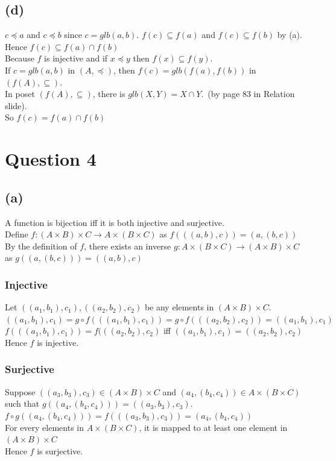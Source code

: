 \documentclass{article} %
\begin{document}
\subsection*{(d)}
$c \preceq a$ and $c \preceq b$ since $c=glb(a,b)$. $ f(c)\subseteq f(a)$ and $ f(c) \subseteq f(b) $ by (a). Hence $f(c) \subseteq f(a) \cap f(b)$\\
Because $f$ is injective and if $x\preceq y$ then $f(x) \subseteq f(y)$.\\
If $c=glb(a,b)$ in $(A, \preceq)$, then $f(c) = glb(f(a),f(b))$ in $(f(A),\subseteq)$.\\
In poset $(f(A), \subseteq)$, there is $glb(X,Y) = X \cap Y$.\ (by page 83 in Relation slide).\\
So $f(c) = f(a) \cap f(b)$


\section*{Question 4}
\subsection*{(a)}
A function is bijection iff it is both injective and surjective.\\
Define $f:(A \times B) \times C \to A \times (B \times C)$ as $f(((a, b),c)) = (a,(b,c))$\\
By the definition of $f$, there exists an inverse $g:A \times (B \times C) \to (A \times B) \times C$ as $g((a,(b,c))) = ((a, b),c)$
\subsubsection*{Injective}
Let $((a_1, b_1), c_1),((a_2, b_2), c_2)$ be any elements in $(A \times B) \times C$.\\
$((a_1, b_1), c_1) = g \circ f(((a_1, b_1), c_1)) = g \circ f(((a_2, b_2), c_2)) = ((a_1, b_1), c_1)$\\
$f(((a_1, b_1), c_1)) = f(((a_2, b_2), c_2)$ iff $((a_1, b_1), c_1)=((a_2, b_2), c_2)$\\
Hence $f$ is injective.
\subsubsection*{Surjective}
Suppose $((a_3, b_3), c_3)\in (A \times B) \times C$ and $(a_4,(b_4, c_4))\in A \times (B \times C)$ such that $ g( (a_4,(b_4, c_4))) = ((a_3, b_3), c_3)$.\\
$f\circ g((a_4,(b_4, c_4))) = f(((a_3, b_3), c_3)) = (a_4,(b_4, c_4))$\\
For every elements in $A \times (B \times C)$, it is mapped to at least one element in $(A \times B) \times C$\\
Hence $f$ is surjective.\\ 
\end{document}
